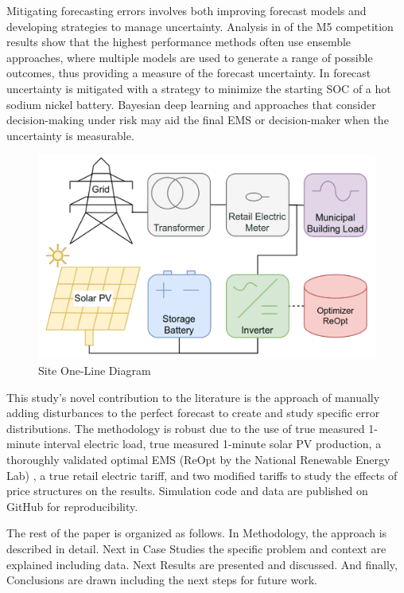 \documentclass[conference]{IEEEtran}
\begin{document}
Mitigating forecasting errors involves both improving forecast models and developing strategies to manage uncertainty. Analysis in \cite{makridakis2022predicting} of the M5 competition results show that the highest performance methods often use ensemble approaches, where multiple models are used to generate a range of possible outcomes, thus providing a measure of the forecast uncertainty. In \cite{grillo2012optimal} forecast uncertainty is mitigated with a strategy to minimize the starting SOC of a hot sodium nickel battery. Bayesian deep learning \cite{sun2019using} and approaches that consider decision-making under risk may aid the final EMS or decision-maker when the uncertainty is measurable.

\begin{figure}
    \centering
    \includegraphics[width=.78\linewidth]{images/one-line.png}
    \caption{Site One-Line Diagram }
    \label{fig:one-line}
\end{figure}

This study's novel contribution to the literature is the approach of manually adding disturbances to the perfect forecast to create and study specific error distributions. The methodology is robust due to the use of true measured 1-minute interval electric load, true measured 1-minute solar PV production, a thoroughly validated optimal EMS (ReOpt by the National Renewable Energy Lab) \cite{simpkins2014reopt}, a true retail electric tariff, and two modified tariffs to study the effects of price structures on the results. Simulation code and data are published on GitHub for reproducibility.

The rest of the paper is organized as follows. In Methodology, the approach is described in detail. Next in Case Studies the specific problem and context are explained including data. Next Results are presented and discussed. And finally, Conclusions are drawn including the next steps for future work.
\end{document}
